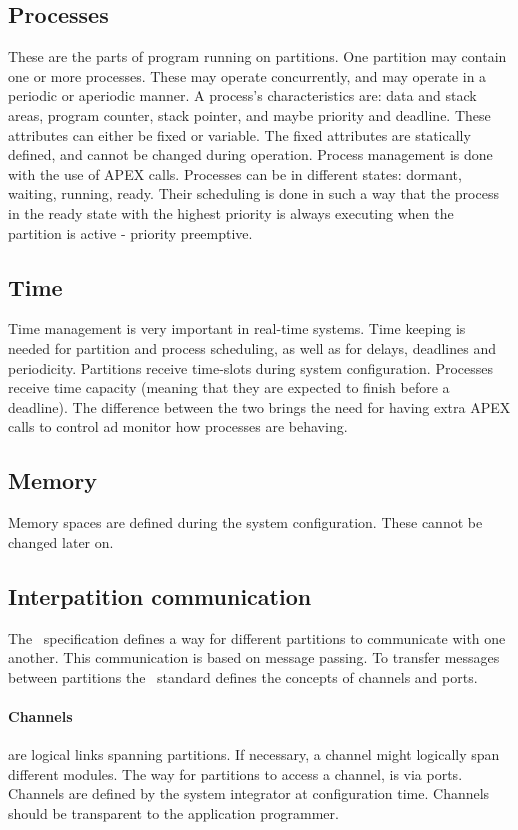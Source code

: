 \subsection{Processes}
These are the parts of program running on partitions. One partition
may contain one or more processes. These may operate concurrently,
and may operate in a periodic or aperiodic manner. A process's 
characteristics are: data and stack areas, program counter, stack pointer,
and maybe priority and deadline. These attributes can either be fixed 
or variable. The fixed attributes are statically defined, and cannot
be changed during operation.
\cite{page_19}
Process management is done with the use of APEX calls.
Processes can be in different states: dormant, waiting, running, ready.
Their scheduling is done in such a way that the process in the ready state
with the highest priority is always executing when the partition is active - priority preemptive.
\cite{page_20}

\subsection{Time}
Time management is very important in real-time systems.
Time keeping is needed for partition and process scheduling,
as well as for delays, deadlines and periodicity.
Partitions receive time-slots during system configuration.
Processes receive time capacity (meaning that they are expected
to finish before a deadline).
The difference between the two brings the need for having extra APEX calls
to control ad monitor how processes are behaving.
\cite{page_25}

\subsection{Memory}
Memory spaces are defined during the system configuration. These cannot
be changed later on.

\subsection{Interpatition communication}
\label{ssec:interpart_comm}
The \arinc\ specification defines a way for different partitions to communicate with one another.
This communication is based on message passing. To transfer messages between partitions the \arinc\ standard
defines the concepts of channels and ports.

\paragraph{Channels} are logical links spanning partitions. If necessary, 
a channel might logically span different modules. 
The way for partitions to access a channel, is via ports.
Channels are defined by the system integrator at configuration time.
Channels should be transparent to the application programmer.


